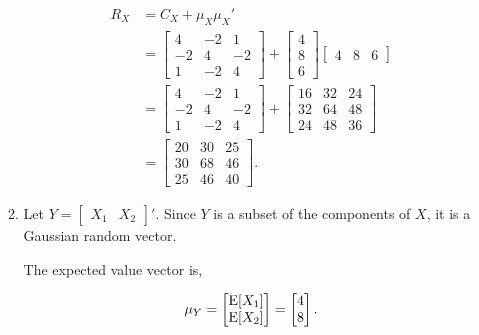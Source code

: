 \documentclass{article}
\begin{document}
\begin{enumerate}
\begin{enumerate}[label=(\alph*)]
        \begin{align*}
        R_X & = C_X + \mu_X \mu_X' \\
            & = \begin{bmatrix}
                4 & -2 & 1 \\
                -2 & 4 & -2 \\
                1 & -2 & 4
                \end{bmatrix} + 
                \begin{bmatrix} 4 \\ 8 \\ 6 \end{bmatrix}
                \begin{bmatrix} 4 & 8 & 6 \end{bmatrix} \\
            & = \begin{bmatrix}
                4 & -2 & 1 \\
                -2 & 4 & -2 \\
                1 & -2 & 4
                \end{bmatrix} + 
                \begin{bmatrix}
                16 & 32 & 24 \\
                32 & 64 & 48 \\         
                24 & 48 & 36
                \end{bmatrix} \\
            & = \begin{bmatrix}
                20 & 30 & 25 \\
                30 & 68 & 46 \\
                25 & 46 & 40
                \end{bmatrix}.
        \end{align*}

        \item

        Let $Y = \begin{bmatrix} X_1 & X_2 \end{bmatrix}'$. Since $Y$ is a subset of the components of $X$, it is a Gaussian random vector.

        The expected value vector is,

        $$\mu_Y = \begin{bmatrix} \text E[X_1] \\ \text E[X_2] \end{bmatrix} = \begin{bmatrix} 4 \\ 8 \end{bmatrix}.$$


\end{enumerate}
\end{enumerate}
\end{document}
